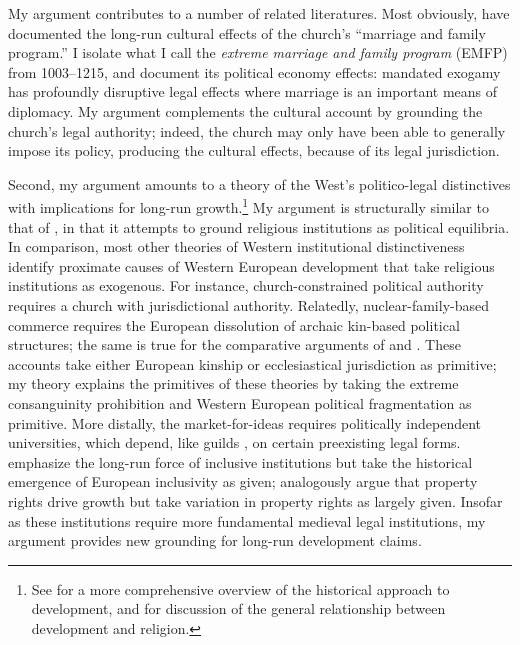\documentclass[12pt]{article}
\theoremstyle{definition}
\theoremstyle{remark}
\begin{document}
My argument contributes to a number of related literatures. Most obviously, \citet{schulz_2019, schulz_2022, henrich_2020} have documented the long-run cultural effects of the church’s “marriage and family program.” I isolate what I call the \textit{extreme marriage and family program} (EMFP) from 1003--1215, and document its political economy effects: mandated exogamy has profoundly disruptive legal effects where marriage is an important means of diplomacy. My argument complements the cultural account by grounding the church's legal authority; indeed, the church may only have been able to generally impose its policy, producing the cultural effects, because of its legal jurisdiction.

Second, my argument amounts to a theory of the West’s politico-legal distinctives with implications for long-run growth.\footnote{See \citet{koyama_rubin_2022} for a more comprehensive overview of the historical approach to development, and \citet{becker_rubin_woessmann_2024} for discussion of the general relationship between development and religion.} My argument is structurally similar to that of \citet{bazzi_koehlerderrick_marx_2020}, in that it attempts to ground religious institutions as political equilibria. In comparison, most other theories of Western institutional distinctiveness identify proximate causes of Western European development that take religious institutions as exogenous. For instance, church-constrained political authority \citep{rubin_2017} requires a church with jurisdictional authority. Relatedly, nuclear-family-based commerce \citep{greif_tabellini_2017} requires the European dissolution of archaic kin-based political structures; the same is true for the comparative arguments of \cite{kuran_2011} and \cite{blaydes_chaney_2013}. These accounts take either European kinship or ecclesiastical jurisdiction as primitive; my theory explains the primitives of these theories by taking the extreme consanguinity prohibition and Western European political fragmentation \citep{fernandezvillaverde_koyama_2023} as primitive. More distally, the market-for-ideas \citep{mokyr_2016} requires politically independent universities, which depend, like guilds \citep{delacroix_doepke_mokyr_2018}, on certain preexisting legal forms. \citet{ajr_2001, acemoglu_robinson_2012} emphasize the long-run force of inclusive institutions but take the historical emergence of European inclusivity as given; analogously \citet{north_thomas_1973} argue that property rights drive growth but take variation in property rights as largely given. Insofar as these institutions require more fundamental medieval legal institutions, my argument provides new grounding for long-run development claims.
\end{document}
